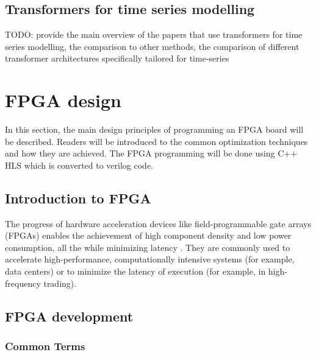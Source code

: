 \documentclass[a4paper, twoside]{report}
\theoremstyle{definition}
\numberwithin{equation}{section}
\begin{document}
\subsection{Transformers for time series modelling}

TODO: provide the main overview of the papers that use transformers for time series modelling,
the comparison to other methods, the comparison of different transformer architectures specifically
tailored for time-series


\section{FPGA design}


In this section, the main design principles of programming an FPGA board will be described. Readers will be introduced to the common optimization techniques and how they are achieved. The FPGA programming will be done using C++ HLS which is converted to verilog code.

\subsection{Introduction to FPGA}


The progress of hardware acceleration devices like field-programmable gate arrays (FPGAs) enables the achievement of high component density and low power consumption,
all the while minimizing latency \cite{10.1007/978-3-319-56258-2_14}.
They are commonly used to accelerate high-performance, computationally intensive systems
(for example, data centers) or to minimize the latency of execution (for example, in high-frequency trading).

\subsection{FPGA development} \label{sec:fpga_development}

\subsubsection{Common Terms}
\end{document}
